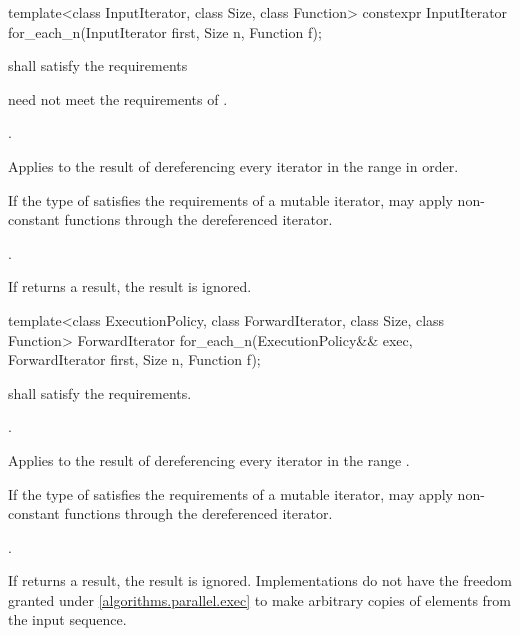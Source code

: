 %
\begin{itemdecl}
template<class InputIterator, class Size, class Function>
  constexpr InputIterator for_each_n(InputIterator first, Size n, Function f);
\end{itemdecl}

\begin{itemdescr}
\pnum
\requires
{} shall satisfy the  requirements
\begin{note}
 need not meet
the requirements of .
\end{note}

\pnum
\requires
{}.

\pnum
\effects
Applies  to the result of dereferencing
every iterator in the range  in order.
\begin{note}
If the type of  satisfies the requirements of a mutable iterator,
 may apply non-constant functions through the dereferenced iterator.
\end{note}

\pnum
\returns
{}.

\pnum
\remarks
If  returns a result, the result is ignored.
\end{itemdescr}

%
\begin{itemdecl}
template<class ExecutionPolicy, class ForwardIterator, class Size, class Function>
  ForwardIterator for_each_n(ExecutionPolicy&& exec, ForwardIterator first, Size n,
                             Function f);
\end{itemdecl}

\begin{itemdescr}
\pnum
\requires
{} shall satisfy the  requirements.

\pnum
\requires
{}.

\pnum
\effects
Applies  to the result of dereferencing
every iterator in the range .
\begin{note}
If the type of  satisfies the requirements of a mutable iterator,
 may apply non-constant functions through the dereferenced iterator.
\end{note}

\pnum
\returns
{}.

\pnum
\remarks
If  returns a result, the result is ignored.
Implementations do not have
the freedom granted under \ref{algorithms.parallel.exec}
to make arbitrary copies of elements from the input sequence.
\end{itemdescr}

